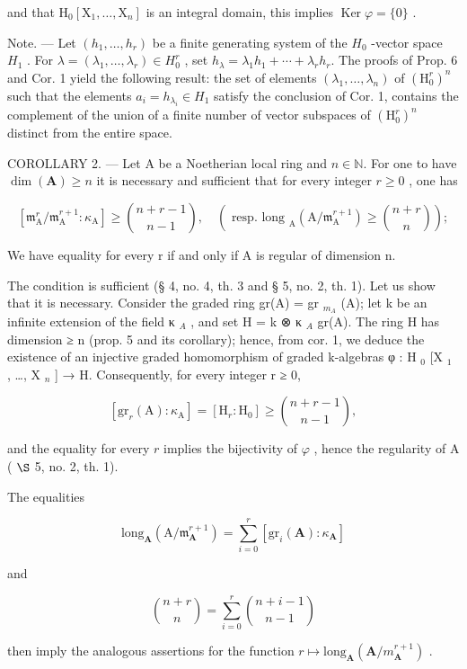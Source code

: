 and that \(\mathrm{H}_0[\mathrm{X}_1, \dots, \mathrm{X}_n]\) is an integral domain, this implies \(\operatorname{Ker} \varphi = \{0\}\) .

Note. --- Let \((h_{1}, \ldots, h_{r})\) be a finite generating system of the \(H_{0}\) -vector space \(H_{1}\) . For \(\lambda = (\lambda_{1}, \ldots, \lambda_{r}) \in H_{0}^{r}\) , set \(h_{\lambda} = \lambda_{1} h_{1} + \cdots + \lambda_{r} h_{r}\). The proofs of Prop. 6 and Cor. 1 yield the following result: the set of elements \((\lambda_{1}, \ldots, \lambda_{n})\) of \((\mathrm{H}_{0}^{r})^{n}\) such that the elements \(a_{i} = h_{\lambda_{i}} \in H_{1}\) satisfy the conclusion of Cor. 1, contains the complement of the union of a finite number of vector subspaces of \((\mathrm{H}_{0}^{r})^{n}\) distinct from the entire space.

COROLLARY 2. --- Let A be a Noetherian local ring and \(n\in\mathbb{N}\). For one to have \(\dim(\mathbf{A})\geqslant n\) it is necessary and sufficient that for every integer \(r\geqslant0\) , one has

\[
\left[ \mathfrak {m} _ {\mathrm{A}} ^ {r} / \mathfrak {m} _ {\mathrm{A}} ^ {r + 1}: \kappa_ {\mathrm{A}} \right] \geqslant \binom {n + r - 1} {n - 1}, \quad \left(\text { resp.   long } _ {\mathrm{A}} (\mathrm{A} / \mathfrak {m} _ {\mathrm{A}} ^ {r + 1}) \geqslant \binom {n + r} {n}\right);
\]

We have equality for every r if and only if A is regular of dimension n.

The condition is sufficient (§ 4, no. 4, th. 3 and § 5, no. 2, th. 1). Let us show that it is necessary. Consider the graded ring gr(A) = gr \(_{m_A}\) (A); let k be an infinite extension of the field κ \(_A\) , and set H = k ⊗ κ \(_A\) gr(A). The ring H has dimension ≥ n (prop. 5 and its corollary); hence, from cor. 1, we deduce the existence of an injective graded homomorphism of graded k-algebras φ : H \(_0\) {[}X \(_1\) , \ldots, X \(_n\) {]} → H. Consequently, for every integer r ≥ 0,

\[
\left[ \mathrm{gr} _ {r} (\mathrm{A}): \kappa_ {\mathrm{A}} \right] = \left[ \mathrm{H} _ {r}: \mathrm{H} _ {0} \right] \geqslant \binom {n + r - 1} {n - 1},
\]

and the equality for every \(r\) implies the bijectivity of \(\varphi\) , hence the regularity of A ( \(\S\) 5, no. 2, th. 1).

The equalities

\[
\mathrm{long} _ {\mathbf {A}} (\mathrm{A} / \mathfrak {m} _ {\mathbf {A}} ^ {r + 1}) = \sum_ {i = 0} ^ {r} \left[ \mathrm{gr} _ {i} (\mathbf {A}): \kappa_ {\mathbf {A}} \right]
\]

and

\[
\binom {n + r} {n} = \sum_ {i = 0} ^ {r} \binom {n + i - 1} {n - 1}
\]

then imply the analogous assertions for the function \(r \mapsto \text{long}_{\mathbf{A}}(\mathbf{A}/m_{\mathbf{A}}^{r+1})\) .

